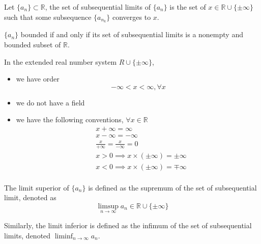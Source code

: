\begin{definition}
    Let $\{ a_n \} \subset \mathbb{R}$, the set of subsequential limits of 
    $\{ a_n \} $ is the set of $x \in \mathbb{R} \cup \{ \pm \infty \} $ such that 
    some subsequence $\{ a_{n_k} \} $ converges to $x$.
\end{definition}

\begin{remark}
    $\{ a_n \} $ bounded if and only if its set of subsequential limits 
    is a nonempty and bounded subset of $\mathbb{R}$.
\end{remark}

\begin{definition}
    In the extended real number system $R \cup \{ \pm \infty \} $,
    \begin{itemize}
        \item we have order
            \[
                -\infty < x < \infty, \forall x
            \]
        \item we do not have a field 
        \item we have the following conventions, $\forall x \in \mathbb{R}$
        \begin{align*}
            & x + \infty = \infty \\
            & x - \infty =  - \infty \\
            & \frac{x}{+ \infty} = \frac{x}{- \infty} = 0 \\
            &x > 0 \implies x \times (\pm \infty) = \pm \infty \\
            &x < 0 \implies x \times (\pm \infty) = \mp \infty \\
            \end{align*}
    \end{itemize} 
\end{definition}


\begin{definition}
    The limit superior of $\{ a_n \} $ is defined as the supremum 
    of the set of subsequential limit, denoted as 
    \[
        \limsup_{ n \to \infty} a_n \in \mathbb{R} \cup \{ \pm \infty \} 
    \]

    Similarly, the limit inferior is defined as the 
    infimum of the set of subsequential limits, denoted
    $\liminf_{n \to \infty} a_n$.
\end{definition}

